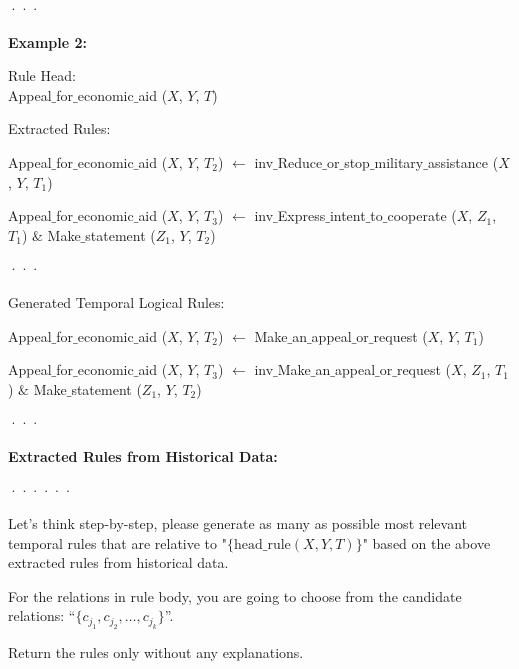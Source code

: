 \documentclass{article}
\begin{document}
\begin{tcolorbox}[colback=white!5!white, colframe=black!75!black, title=Prompt for Rule Generation]
\hspace*{1cm} ···

\bigskip
\textbf{Example 2:}

\hspace*{0.5cm} Rule Head:\\ 
\hspace*{1cm} Appeal$\_$for$\_$economic$\_$aid ($X$, $Y$, $T$)

\hspace*{0.5cm} Extracted Rules:

\hspace*{1cm} Appeal$\_$for$\_$economic$\_$aid ($X$, $Y$, $T_2$) $\leftarrow$ inv$\_$Reduce$\_$or$\_$stop$\_$military$\_$assistance ($X$, $Y$, $T_1$)

\hspace*{1cm} Appeal$\_$for$\_$economic$\_$aid ($X$, $Y$, $T_3$) $\leftarrow$ inv$\_$Express$\_$intent$\_$to$\_$cooperate ($X$, $Z_1$, $T_1$) $\&$ Make$\_$statement ($Z_1$, $Y$, $T_2$)

\hspace*{1cm} ···

\hspace*{0.5cm} Generated Temporal Logical Rules:

\hspace*{1cm} Appeal$\_$for$\_$economic$\_$aid ($X$, $Y$, $T_2$) $\leftarrow$ Make$\_$an$\_$appeal$\_$or$\_$request ($X$, $Y$, $T_1$)

\hspace*{1cm} Appeal$\_$for$\_$economic$\_$aid ($X$, $Y$, $T_3$) $\leftarrow$ inv$\_$Make$\_$an$\_$appeal$\_$or$\_$request ($X$, $Z_1$, $T_1$) $\&$ Make$\_$statement ($Z_1$, $Y$, $T_2$)

\hspace*{1cm} ···

\bigskip
\textbf{Extracted Rules from Historical Data:}

\hspace*{0.5cm} ······

\bigskip
\hspace*{0.5cm} Let's think step-by-step, please generate as many as possible most relevant temporal rules that are relative to "$\{\text{head}\_\text{rule} (X,Y,T)\}$" based on the above extracted rules from historical data.

\hspace*{0.5cm} For the relations in rule body, you are going to choose from the candidate relations: ``$\{c_{j_1}, c_{j_2}, \ldots, c_{j_k}\}$''.

\bigskip
\hspace*{0.5cm} Return the rules only without any explanations.
\end{tcolorbox}
\end{document}
